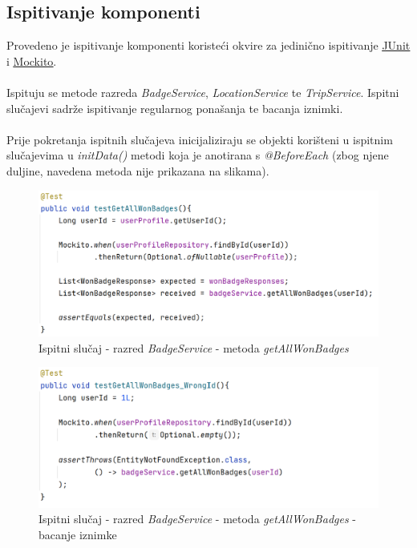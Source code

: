 			\subsection{Ispitivanje komponenti}
			Provedeno je ispitivanje komponenti koristeći okvire za jedinično ispitivanje \underline{\href{https://junit.org/junit5/}{JUnit}} i \underline{\href{https://site.mockito.org/}{Mockito}}. 
           \\
           \\
           Ispituju se metode razreda \textit{BadgeService}, \textit{LocationService} te \textit{TripService}. Ispitni slučajevi sadrže ispitivanje regularnog ponašanja te bacanja iznimki. 
           \\
           \\
           Prije pokretanja ispitnih slučajeva inicijaliziraju se objekti korišteni u ispitnim slučajevima u \textit{initData()} metodi koja je anotirana s \textit{@BeforeEach} (zbog njene duljine, navedena metoda nije prikazana na slikama).
			
        \begin{figure}[H]
            \includegraphics[scale=0.9]{slike/unit_test_badge_get_all.png} 
              \centering
            \caption{Ispitni slučaj - razred \textit{BadgeService} - metoda \textit{getAllWonBadges}}
        \end{figure}

         \begin{figure}[H]
            \includegraphics[scale=0.9]{slike/unit_test_location_wrong_id.png} 
              \centering
            \caption{Ispitni slučaj - razred \textit{BadgeService} - metoda \textit{getAllWonBadges} - bacanje iznimke}
        \end{figure}

